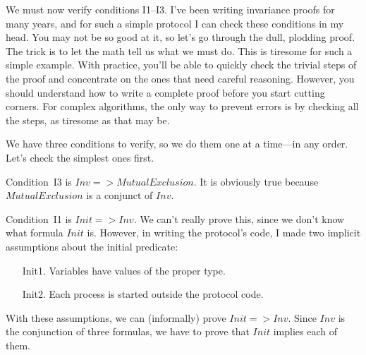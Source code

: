 \documentclass[fleqn,leqno]{article}
\begin{document}
\medskip 

We must now verify conditions I1--I3.  I've been writing invariance
proofs for many years, and for such a simple protocol I can check
these conditions in my head.  You may not be so good at it, so let's
go through the dull, plodding proof.  The trick is to let the math
tell us what we must do.  This is tiresome for such a simple example.
With practice, you'll be able to quickly check the trivial steps of
the proof and concentrate on the ones that need careful reasoning.
However, you should understand how to write a complete proof before
you start cutting corners.  For complex algorithms, the only way to
prevent errors is by checking all the steps, as tiresome as that may
be.

We have three conditions to verify, so we do them one at a time---in
any order.  Let's check the simplest ones first.

\begin{sloppypar}
Condition~I3 is $Inv => {MutualExclusion}$.  It is obviously true because ${MutualExclusion}$ is a
conjunct of $Inv$.
\end{sloppypar}


Condition~I1 is $Init => Inv$.  We can't really prove this, since we
don't know what formula $Init$ is.  However, in writing the protocol's
code, I made two implicit assumptions about the initial predicate:
\begin{display}
\begin{itemize}
\item[Init1.] Variables have values of the proper type.

\item[Init2.] Each process is started outside the protocol code.  
\end{itemize}
\end{display}
With these assumptions, we can (informally) prove $Init => Inv$.
Since $Inv$ is the conjunction of three formulas, we have to prove
that $Init$ implies each of them.  
\end{document}
